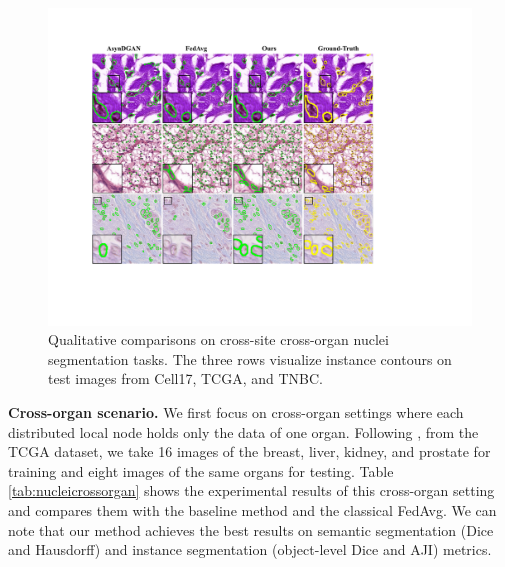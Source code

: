 \documentclass[letterpaper]{article} %
\begin{document}
\begin{figure}[h]
\centering
\includegraphics[width=1.0\linewidth]{fig/fig3.pdf}
\caption{Qualitative comparisons on cross-site cross-organ nuclei segmentation tasks. The three rows visualize instance contours on test images from Cell17, TCGA, and TNBC.}
\label{fig3}
\end{figure}

\textbf{Cross-organ scenario.}
We first focus on cross-organ settings where each distributed local node holds only the data of one organ. Following \cite{chang2020synthetic}, from the TCGA dataset, we take 16 images of the breast, liver, kidney, and prostate for training and eight images of the same organs for testing.
Table \ref{tab:nucleicrossorgan} shows the experimental results of this cross-organ setting and compares them with the baseline method \cite{chang2020synthetic} and the classical FedAvg. We can note that our method achieves the best results on semantic segmentation (Dice and Hausdorff) and instance segmentation (object-level Dice and AJI) metrics. %
\end{document}
